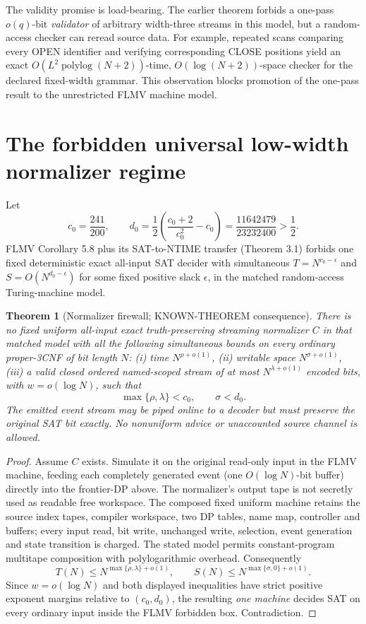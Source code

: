 \documentclass[11pt]{article}
\newtheorem{theorem}{Theorem}
\begin{document}
The validity promise is load-bearing. The earlier theorem forbids
a one-pass $o(q)$-bit \emph{validator} of arbitrary width-three streams
in this model, but a random-access checker can reread source data.
For example, repeated scans comparing every OPEN identifier
and verifying corresponding CLOSE positions yield an exact
$O(L^2\operatorname{polylog}(N+2))$-time,
$O(\log(N+2))$-space checker for the declared fixed-width grammar.
This observation blocks promotion of the one-pass result to the
unrestricted FLMV machine model.

\section{The forbidden universal low-width normalizer regime}
Let
\[
c_0=\frac{241}{200},\qquad
d_0=\frac12\left(\frac{c_0+2}{c_0^2}-c_0\right)
=\frac{11642479}{23232400}>\frac12.
\]
FLMV Corollary 5.8 plus its SAT-to-NTIME transfer (Theorem 3.1)
forbids one fixed deterministic exact all-input SAT decider
with simultaneous $T=N^{c_0-\epsilon}$ and
$S=O(N^{d_0-\epsilon})$ for some fixed positive slack $\epsilon$,
in the matched random-access Turing-machine model.

\begin{theorem}[Normalizer firewall; KNOWN-THEOREM consequence]
There is no fixed uniform all-input exact truth-preserving
\emph{streaming} normalizer $C$ in that matched model with all the
following simultaneous bounds on every ordinary proper-3CNF of bit
length $N$: (i) time $N^{\rho+o(1)}$, (ii) writable space
$N^{\sigma+o(1)}$, (iii) a \emph{valid closed} ordered named-scoped
stream of at most $N^{\lambda+o(1)}$ encoded bits, with
$w=o(\log N)$, such that
\[
\boxed{\max\{\rho,\lambda\}<c_0,\qquad \sigma<d_0.}
\]
The emitted event stream may be piped online to a decoder but must
preserve the original SAT bit exactly. No nonuniform advice or
unaccounted source channel is allowed.
\end{theorem}
\begin{proof}
Assume $C$ exists. Simulate it on the original read-only input in
the FLMV machine, feeding each completely generated event (one
$O(\log N)$-bit buffer) directly into the frontier-DP above.
The normalizer's output tape is not secretly used as readable free
workspace. The composed fixed uniform machine retains the source
index tapes, compiler workspace, two DP tables, name map, controller
and buffers; every input read, bit write, unchanged write, selection,
event generation and state transition is charged. The stated model
permits constant-program multitape composition with polylogarithmic
overhead. Consequently
\[
T(N)\le N^{\max\{\rho,\lambda\}+o(1)},\qquad
S(N)\le N^{\max\{\sigma,0\}+o(1)}.
\]
Since $w=o(\log N)$ and both displayed inequalities have strict
positive exponent margins relative to $(c_0,d_0)$, the resulting
\emph{one machine} decides SAT on every ordinary input inside the
FLMV forbidden box. Contradiction.
\end{proof}
\end{document}
